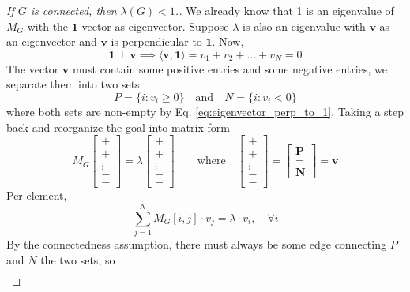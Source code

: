 \documentclass[11pt, letter]{book}
\newcommand{\bv}{\mathbf{v}}
\begin{document}
\begin{proof} [If $G$ is connected, then $\lambda(G) < 1$.] We already know that 1 is an eigenvalue of $M_G$ with the $\mathbf 1$ vector as eigenvector. Suppose $\lambda$ is also an eigenvalue with $\bv$ as an eigenvector and $\bv$ is perpendicular to $\mathbf 1$. Now, 
\begin{equation}
	\label{eq:eigenvector_perp_to_1}
	\mathbf 1 \perp \bv \implies \langle \bv, \mathbf 1 \rangle = v_1 + v_2 + \dots  + v_N  = 0
\end{equation}
The vector $\bv$ must contain some positive entries and some negative entries, we separate them into two sets
\begin{equation}
	P = \{ i : v_i \geq 0\} \quad \text{and} \quad N = \{ i : v_i < 0 \}
\end{equation}
where both sets are non-empty by Eq. \ref{eq:eigenvector_perp_to_1}. Taking a step back and reorganize the goal into matrix form
\begin{equation}
	M_G \begin{bmatrix}
		+ \\ + \\ \vdots \\ - \\ -
	\end{bmatrix} = \lambda \begin{bmatrix}
		+ \\ + \\ \vdots \\ - \\ -
	\end{bmatrix}\quad \quad \text{where} \quad \begin{bmatrix}
		+ \\ + \\ \vdots \\ - \\ - \end{bmatrix} = \begin{bmatrix}
			\mathbf P \\ - \\ \mathbf N
		\end{bmatrix} = \bv
\end{equation}
Per element, 
\begin{equation}
	\sum_{j = 1}^N M_G[i, j]\cdot v_j = \lambda \cdot v_i, \quad \forall i
\end{equation}
By the connectedness assumption, there must always be some edge connecting $P$ and $N$ the two sets, so
\begin{align}

\end{align}
\end{proof}
\end{document}
